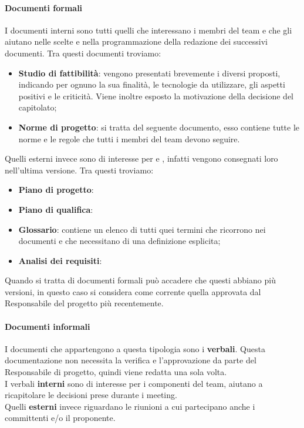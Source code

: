 \paragraph{Documenti formali} 
I documenti interni sono tutti quelli che interessano i membri del team e che gli aiutano nelle scelte e nella programmazione della redazione dei successivi documenti. 
Tra questi documenti troviamo:
\begin{itemize}
\item\textbf{Studio di fattibilità}: vengono presentati brevemente i diversi  proposti, indicando per ognuno la sua finalità, le tecnologie da utilizzare, gli aspetti positivi e le criticità. Viene inoltre esposto la motivazione della decisione del capitolato;
\item\textbf{Norme di progetto}: si tratta del seguente documento, esso contiene tutte le norme e le regole che tutti i membri del team devono seguire.
\end{itemize}
Quelli esterni invece sono di interesse per  e , infatti vengono consegnati loro nell'ultima versione.
Tra questi troviamo:
\begin{itemize}
\item\textbf{Piano di progetto}: %
\item\textbf{Piano di qualifica}:%
\item\textbf{Glossario}: contiene un elenco di tutti quei termini che ricorrono nei documenti e che necessitano di una definizione esplicita;
\item\textbf{Analisi dei requisiti}:%
\end{itemize}
Quando si tratta di documenti formali può accadere che questi abbiano più versioni, in questo caso si considera come corrente quella approvata dal Responsabile del progetto più recentemente.

\paragraph{Documenti informali} 
I documenti che appartengono a questa tipologia sono i \textbf{verbali}.
Questa documentazione non necessita la verifica e l'approvazione da parte del Responsabile di progetto, quindi viene redatta una sola volta.\\
I verbali \textbf{interni} sono di interesse per i componenti del team, aiutano a ricapitolare le decisioni prese durante i meeting.\\
Quelli \textbf{esterni} invece riguardano le riunioni a cui partecipano anche i committenti e/o il proponente.

